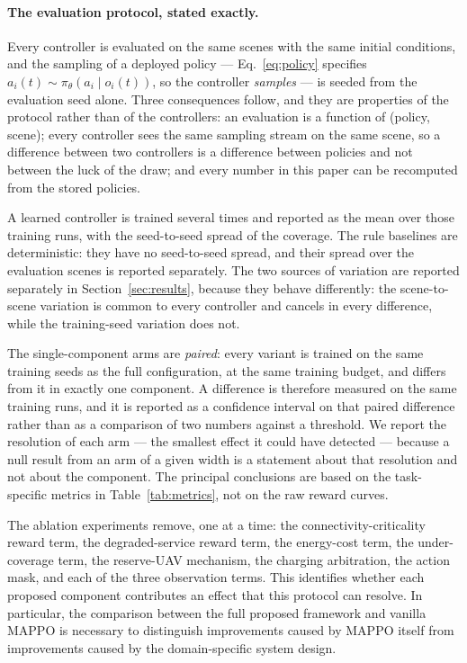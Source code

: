 \documentclass[conference]{IEEEtran}
\begin{document}
\paragraph{The evaluation protocol, stated exactly.} Every controller is
evaluated on the same scenes with the same initial conditions, and the
sampling of a deployed policy --- Eq.~\eqref{eq:policy} specifies
$a_i(t)\sim\pi_\theta(a_i\mid o_i(t))$, so the controller \emph{samples} ---
is seeded from the evaluation seed alone. Three consequences follow, and
they are properties of the protocol rather than of the controllers: an
evaluation is a function of (policy, scene); every controller sees the
same sampling stream on the same scene, so a difference between two
controllers is a difference between policies and not between the luck of
the draw; and every number in this paper can be recomputed from the
stored policies.

A learned controller is trained several times and reported as the mean
over those training runs, with the seed-to-seed spread of the coverage.
The rule baselines are deterministic: they have no seed-to-seed spread,
and their spread over the evaluation scenes is reported separately. The
two sources of variation are reported separately in
Section~\ref{sec:results}, because they behave differently: the
scene-to-scene variation is common to every controller and cancels in
every difference, while the training-seed variation does not.

The single-component arms are \emph{paired}: every variant is trained on
the same training seeds as the full configuration, at the same training
budget, and differs from it in exactly one component. A difference is
therefore measured on the same training runs, and it is reported as a
confidence interval on that paired difference rather than as a comparison
of two numbers against a threshold. We report the resolution of each arm
--- the smallest effect it could have detected --- because a null result
from an arm of a given width is a statement about that resolution and not
about the component. The principal conclusions are based on the
task-specific metrics in Table~\ref{tab:metrics}, not on the raw reward
curves.

The ablation experiments remove, one at a time: the connectivity-criticality reward term, the degraded-service reward term, the energy-cost term, the under-coverage term, the reserve-UAV mechanism, the charging arbitration, the action mask, and each of the three observation terms. This identifies whether each proposed component contributes an effect that this protocol can resolve. In particular, the comparison between the full proposed framework and vanilla MAPPO is necessary to distinguish improvements caused by MAPPO itself from improvements caused by the domain-specific system design.
\end{document}
